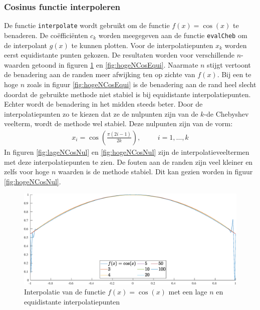 \documentclass[a4paper, 12pt, titlepage, fleqn]{article}
\begin{document}
\subsubsection{Cosinus functie interpoleren}
\label{cosInterpoleren}
De functie \texttt{interpolate} wordt gebruikt om de functie $f(x) = \cos(x)$ te benaderen. De co\"effici\"enten $c_k$ worden meegegeven aan de functie \texttt{evalCheb} om de interpolant $g(x)$ te kunnen plotten. Voor de interpolatiepunten $x_k$ worden eerst equidistante punten gekozen. De resultaten worden voor verschillende $n$-waarden getoond in figuren \ref{lageNCosEqui} en \ref{fig:hogeNCosEqui}. Naarmate $n$ stijgt vertoont de benadering aan de randen meer afwijking ten op zichte van $f(x)$. Bij een te hoge $n$ zoals in figuur \ref{fig:hogeNCosEqui} is de benadering aan de rand heel slecht doordat de gebruikte methode niet stabiel is bij equidistante interpolatiepunten. Echter wordt de benadering in het midden steeds beter. Door de interpolatiepunten zo te kiezen dat ze de nulpunten zijn van de $k$-de Chebyshev veelterm, wordt de methode wel stabiel. Deze nulpunten zijn van de vorm:
\begin{align*}
x_i = \cos\left(\frac{\pi(2i-1)}{2k}\right), \hspace{1cm} i = 1,\ldots,k
\end{align*}
In figuren \ref{fig:lageNCosNul} en \ref{fig:hogeNCosNul} zijn de interpolatieveeltermen met deze interpolatiepunten te zien. De fouten aan de randen zijn veel kleiner en zelfs voor hoge $n$ waarden is de methode stabiel. Dit kan gezien worden in figuur \ref{fig:hogeNCosNul}.


\begin{figure}
\centering
\includegraphics[scale=0.4]{../Afbeeldingen/cos_equi_laag.eps}
\caption{Interpolatie van de functie $f(x) = \cos(x)$ met een lage $n$ en equidistante interpolatiepunten}
\label{lageNCosEqui}
\end{figure}
\end{document}
